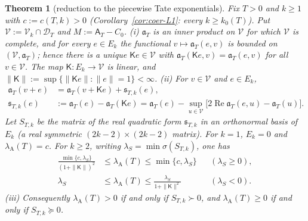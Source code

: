 \documentclass[10pt]{amsart}
\newtheorem{theorem}{Theorem}[section]
\theoremstyle{definition}
\theoremstyle{remark}
\newcommand{\Rel}{\operatorname{Re}}
\newcommand{\lamA}{\lambda_{\mathrm A}(T)}
\newcommand{\Aconst}{\mathsf A_T}
\begin{document}
\begin{theorem}[reduction to the piecewise Tate exponentials]\label{thm:coer-schur}
Fix $T>0$ and $k\ge1$ with $c:=c(T,k)>0$ (Corollary~\ref{cor:coer-L1}: every $k\ge k_0(T)$). Put
$\mathcal V:=\mathcal V_k\cap\mathcal D_T$ and $M:=\Aconst-C_0$.
\emph{(i)} $\mathfrak a_T$ is an inner product on $\mathcal V$ for which $\mathcal V$ is complete, and for every
$e\in E_k$ the functional $v\mapsto\mathfrak a_T(e,v)$ is bounded on $(\mathcal V,\mathfrak a_T)$; hence there is a unique
$\mathsf Ke\in\mathcal V$ with $\mathfrak a_T(\mathsf Ke,v)=\mathfrak a_T(e,v)$ for all $v\in\mathcal V$. The map $\mathsf K:E_k\to\mathcal V$ is linear,
and $\|\mathsf K\|:=\sup\{\|\mathsf Ke\|:\|e\|=1\}<\infty$.
\emph{(ii)} For $v\in\mathcal V$ and $e\in E_k$,
\begin{equation}\label{eq:coer-schur}
\begin{split}
\mathfrak a_T(v+e)&=\mathfrak a_T(v+\mathsf Ke)+\mathfrak s_{T,k}(e),\\
\mathfrak s_{T,k}(e)&:=\mathfrak a_T(e)-\mathfrak a_T(\mathsf Ke)=\mathfrak a_T(e)-\sup_{u\in\mathcal V}\big[2\Rel\mathfrak a_T(e,u)-\mathfrak a_T(u)\big].
\end{split}
\end{equation}
Let $S_{T,k}$ be the matrix of the real quadratic form $\mathfrak s_{T,k}$ in an orthonormal basis of $E_k$ (a
real symmetric $(2k-2)\times(2k-2)$ matrix). For $k=1$, $E_k=0$ and $\lamA=c$.
For $k\ge2$, writing $\lambda_S=\min\sigma(S_{T,k})$, one has
\begin{equation}\label{eq:coer-sandwich}
\begin{aligned}
 \frac{\min\{c,\lambda_S\}}{(1+\|\mathsf K\|)^2}
 &\le\lamA\le\min\{c,\lambda_S\} &&(\lambda_S\ge0),\\
 \lambda_S &\le\lamA\le\frac{\lambda_S}{1+\|\mathsf K\|^2} &&(\lambda_S<0).
\end{aligned}
\end{equation}
\emph{(iii)} Consequently $\lamA>0$ if and only if $S_{T,k}\succ0$, and $\lamA\ge0$ if and only if $S_{T,k}\succeq0$.
\end{theorem}
\end{document}
